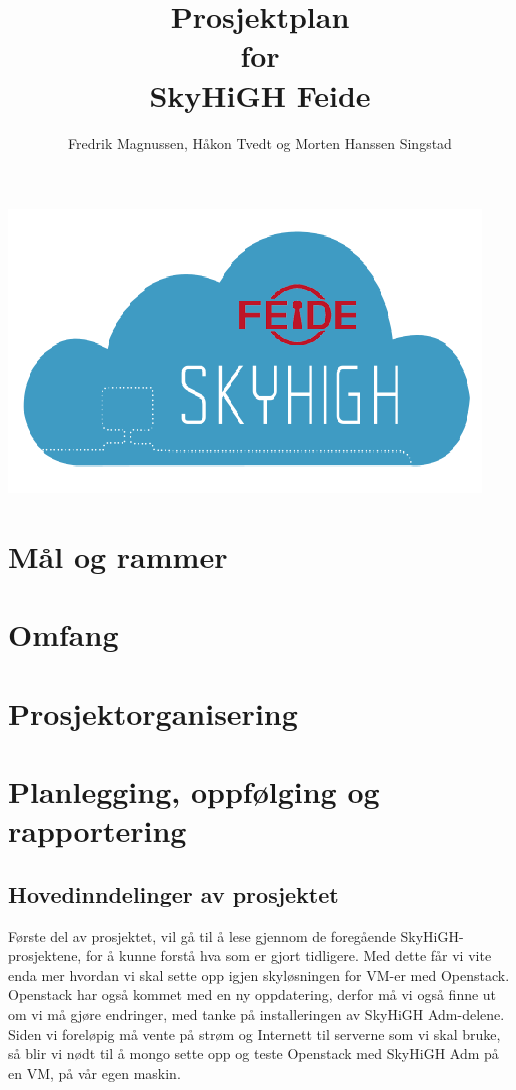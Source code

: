 \documentclass[12pt,a4paper]{article}
\begin{document}
\title{Prosjektplan \\ for \\ SkyHiGH Feide}
\author{Fredrik Magnussen, Håkon Tvedt og Morten Hanssen Singstad}
\maketitle
\begin{center}
\includegraphics[scale=1]{logo.png}
\end{center}

\newpage
\tableofcontents

\newpage
\section{Mål og rammer}

\section{Omfang}

\section{Prosjektorganisering}

\section{Planlegging, oppfølging og rapportering}
\subsection{Hovedinndelinger av prosjektet}
Første del av prosjektet, vil gå til å lese gjennom de foregående SkyHiGH-prosjektene, for å kunne forstå hva som er 
gjort tidligere. Med dette får vi vite enda mer hvordan vi skal sette opp igjen skyløsningen for VM-er med Openstack.
Openstack har også kommet med en ny oppdatering, derfor må vi også finne ut om vi må gjøre endringer, med tanke på installeringen 
av SkyHiGH Adm-delene. Siden vi foreløpig må vente på strøm og Internett til serverne som vi skal bruke, så blir vi nødt til å mongo
sette opp og teste Openstack med SkyHiGH Adm på en VM, på vår egen maskin. \newline \newline
\end{document}
